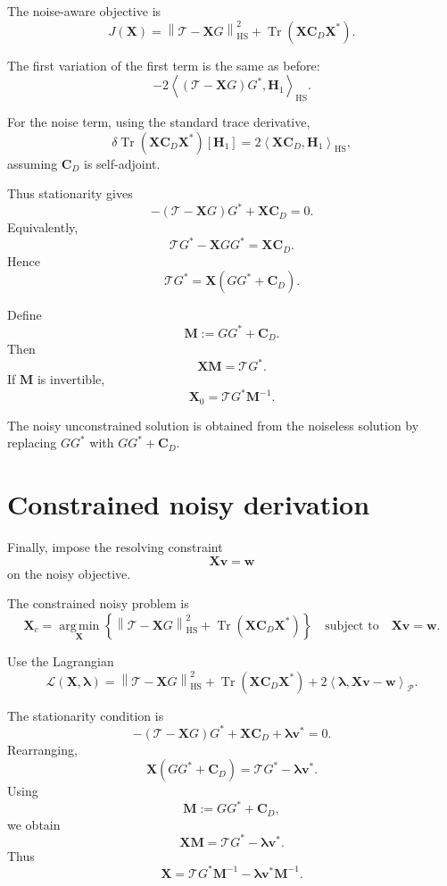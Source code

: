 \documentclass[11pt,openany]{book}
\theoremstyle{definition}
\theoremstyle{remark}
\newcommand{\Pspace}{\mathcal P}
\newcommand{\Tau}{\mathcal{T}}
\newcommand{\Tr}{\operatorname{Tr}}
\newcommand{\HS}{\mathrm{HS}}
\newcommand{\argmin}{\operatorname*{arg\,min}}
\begin{document}
The noise-aware objective is
\[
  J(\mathbf X)
  =
  \left\|
    \Tau-\mathbf XG
  \right\|_{\HS}^2
  +
  \Tr(\mathbf X\mathbf C_D\mathbf X^*).
\]

The first variation of the first term is the same as before:
\[
  -2
  \left\langle
    (\Tau-\mathbf XG)G^*,
    \mathbf H_1
  \right\rangle_{\HS}.
\]

For the noise term, using the standard trace derivative,
\[
  \delta
  \Tr(\mathbf X\mathbf C_D\mathbf X^*)[\mathbf H_1]
  =
  2
  \left\langle
    \mathbf X\mathbf C_D,
    \mathbf H_1
  \right\rangle_{\HS},
\]
assuming \(\mathbf C_D\) is self-adjoint.

Thus stationarity gives
\[
  -(\Tau-\mathbf XG)G^*+\mathbf X\mathbf C_D=0.
\]
Equivalently,
\[
  \Tau G^*-\mathbf XGG^*
  =
  \mathbf X\mathbf C_D.
\]
Hence
\[
  \Tau G^*
  =
  \mathbf X(GG^*+\mathbf C_D).
\]

Define
\[
  \mathbf M:=GG^*+\mathbf C_D.
\]
Then
\[
  \mathbf X\mathbf M=\Tau G^*.
\]
If \(\mathbf M\) is invertible,
\[
  \boxed{
    \mathbf X_0=\Tau G^*\mathbf M^{-1}.
  }
\]

\begin{checkpointbox}
The noisy unconstrained solution is obtained from the noiseless solution by replacing
\(GG^*\) with \(GG^*+\mathbf C_D\).
\end{checkpointbox}

\section{Constrained noisy derivation}

Finally, impose the resolving constraint
\[
  \mathbf X\mathbf v=\mathbf w
\]
on the noisy objective.

The constrained noisy problem is
\[
  \mathbf X_c
  =
  \argmin_{\mathbf X}
  \left\{
    \left\|
      \Tau-\mathbf XG
    \right\|_{\HS}^2
    +
    \Tr(\mathbf X\mathbf C_D\mathbf X^*)
  \right\}
  \quad
  \text{subject to}
  \quad
  \mathbf X\mathbf v=\mathbf w.
\]

Use the Lagrangian
\[
  \mathcal L(\mathbf X,\boldsymbol\lambda)
  =
  \left\|
    \Tau-\mathbf XG
  \right\|_{\HS}^2
  +
  \Tr(\mathbf X\mathbf C_D\mathbf X^*)
  +
  2
  \left\langle
    \boldsymbol\lambda,
    \mathbf X\mathbf v-\mathbf w
  \right\rangle_{\Pspace}.
\]

The stationarity condition is
\[
  -(\Tau-\mathbf XG)G^*
  +
  \mathbf X\mathbf C_D
  +
  \boldsymbol\lambda\mathbf v^*
  =
  0.
\]
Rearranging,
\[
  \mathbf X(GG^*+\mathbf C_D)
  =
  \Tau G^*-\boldsymbol\lambda\mathbf v^*.
\]
Using
\[
  \mathbf M:=GG^*+\mathbf C_D,
\]
we obtain
\[
  \mathbf X\mathbf M
  =
  \Tau G^*-\boldsymbol\lambda\mathbf v^*.
\]
Thus
\[
  \mathbf X
  =
  \Tau G^*\mathbf M^{-1}
  -
  \boldsymbol\lambda\mathbf v^*\mathbf M^{-1}.
\]
\end{document}
